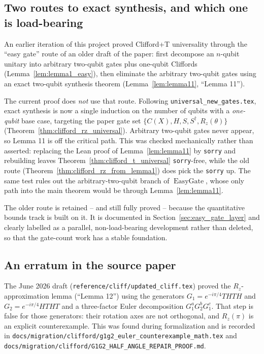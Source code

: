 \subsection{Two routes to exact synthesis, and which one is load-bearing}

An earlier iteration of this project proved Clifford+T universality through
the ``easy gate'' route of an older draft of the paper: first decompose an
$n$-qubit unitary into arbitrary two-qubit gates plus one-qubit Cliffords
(Lemma~\ref{lem:lemma1_easy}), then eliminate the arbitrary two-qubit gates
using an exact two-qubit synthesis theorem (Lemma~\ref{lem:lemma11}, ``Lemma
11'').

The current proof does \emph{not} use that route.  Following
\texttt{universal\_new\_gates.tex}, exact synthesis is now a single induction
on the number of qubits with a \emph{one-qubit} base case, targeting the paper
gate set $\{C(X), H, S, S^\dagger, R_z(\theta)\}$
(Theorem~\ref{thm:clifford_rz_universal}).  Arbitrary two-qubit gates never
appear, so Lemma 11 is off the critical path.  This was checked
mechanically rather than asserted: replacing the Lean proof of
Lemma~\ref{lem:lemma11} by \texttt{sorry} and rebuilding leaves
Theorem~\ref{thm:clifford_t_universal} \texttt{sorry}-free, while the old
route (Theorem~\ref{thm:clifford_rz_from_lemma1}) does pick the
\texttt{sorry} up.  The same test rules out the arbitrary-two-qubit branch of
$\operatorname{EasyGate}$, whose only path into the main theorem would be
through Lemma~\ref{lem:lemma11}.

The older route is retained -- and still fully proved -- because the
quantitative bounds track is built on it.  It is documented in
Section~\ref{sec:easy_gate_layer} and clearly labelled as a parallel,
non-load-bearing development rather than deleted, so that the gate-count
work has a stable foundation.

\subsection{An erratum in the source paper}

The June 2026 draft (\texttt{reference/cliff/updated\_cliff.tex}) proved the
$R_z$-approximation lemma (``Lemma 12'') using the generators
$G_1 = e^{-i\pi/4}THTH$ and $G_2 = e^{-i\pi/4}HTHT$ and a three-factor
Euler decomposition $G_1^{a}G_2^{b}G_1^{c}$.  That step is false for those
generators: their rotation axes are not orthogonal, and $R_z(\pi)$ is an
explicit counterexample.  This was found during formalization and is recorded
in \texttt{docs/migration/clifford/g1g2\_euler\_counterexample\_math.tex} and
\texttt{docs/migration/clifford/G1G2\_HALF\_ANGLE\_REPAIR\_PROOF.md}.

